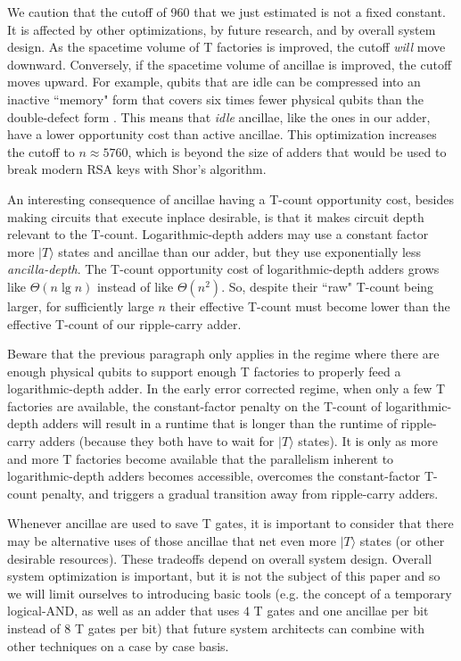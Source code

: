 \documentclass[twocolumn]{quantumarticle-customized}
\begin{document}
We caution that the cutoff of 960 that we just estimated is not a fixed constant.
It is affected by other optimizations, by future research, and by overall system design.
As the spacetime volume of T factories is improved, the cutoff {\em will} move downward.
Conversely, if the spacetime volume of ancillae is improved, the cutoff moves upward.
For example, qubits that are idle can be compressed into an inactive ``memory" form that covers six times fewer physical qubits than the double-defect form \cite{horsman2012}.
This means that {\em idle} ancillae, like the ones in our adder, have a lower opportunity cost than active ancillae.
This optimization increases the cutoff to $n \approx 5760$, which is beyond the size of adders that would be used to break modern RSA keys with Shor's algorithm.

An interesting consequence of ancillae having a T-count opportunity cost, besides making circuits that execute inplace desirable, is that it makes circuit depth relevant to the T-count.
Logarithmic-depth adders may use a constant factor more $|T\rangle$ states and ancillae than our adder, but they use exponentially less {\em ancilla-depth}.
The T-count opportunity cost of logarithmic-depth adders grows like $\Theta(n \lg n)$ instead of like $\Theta(n^2)$.
So, despite their ``raw" T-count being larger, for sufficiently large $n$ their effective T-count must become lower than the effective T-count of our ripple-carry adder.

Beware that the previous paragraph only applies in the regime where there are enough physical qubits to support enough T factories to properly feed a logarithmic-depth adder.
In the early error corrected regime, when only a few T factories are available, the constant-factor penalty on the T-count of logarithmic-depth adders will result in a runtime that is longer than the runtime of ripple-carry adders (because they both have to wait for $|T\rangle$ states).
It is only as more and more T factories become available that the parallelism inherent to logarithmic-depth adders becomes accessible, overcomes the constant-factor T-count penalty, and triggers a gradual transition away from ripple-carry adders.

Whenever ancillae are used to save T gates, it is important to consider that there may be alternative uses of those ancillae that net even more $|T\rangle$ states (or other desirable resources).
These tradeoffs depend on overall system design.
Overall system optimization is important, but it is not the subject of this paper and so we will limit ourselves to introducing basic tools (e.g. the concept of a temporary logical-AND, as well as an adder that uses $4$ T gates and one ancillae per bit instead of $8$ T gates per bit) that future system architects can combine with other techniques on a case by case basis.
\end{document}
